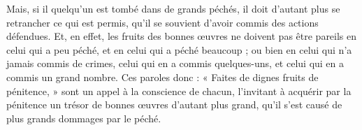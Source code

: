Mais, si il quelqu’un est tombé dans de grands péchés, il doit d’autant plus se retrancher ce qui est permis, qu’il se souvient d’avoir commis des actions défendues. Et, en effet, les fruits des bonnes œuvres ne doivent pas être pareils en celui qui a peu péché, et en celui qui a péché beaucoup ; ou bien en celui qui n’a jamais commis de crimes, celui qui en a commis quelques-uns, et celui qui en a commis un grand nombre. Ces paroles donc : « Faites de dignes fruits de pénitence, » sont un appel à la conscience de chacun, l’invitant à acquérir par la pénitence un trésor de bonnes œuvres d’autant plus grand, qu’il s’est causé de plus grands dommages par le péché.